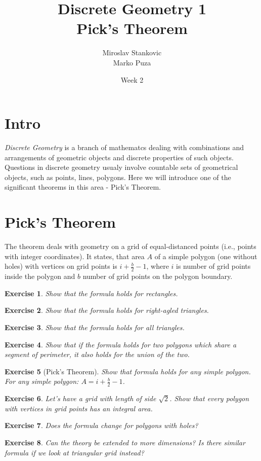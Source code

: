 \documentclass[12pt]{article}
\title{\textbf{Discrete Geometry 1}\\Pick's Theorem}
\date{Week 2}
\author{Miroslav Stankovic\\ Marko Puza}
\newtheorem{exercise}{Exercise}
\begin{document}
\maketitle

\section{Intro}

\emph{Discrete Geometry} is a branch of mathematcs dealing with combinations and arrangements of geometric objects and discrete properties of such objects. Questions in discrete geometry usualy involve countable sets of geometrical objects, such as points, lines, polygons. Here we will introduce one of the significant theorems in this area - Pick's Theorem. 


\section{Pick's Theorem}

The theorem deals with geometry on a grid of equal-distanced points (i.e., points with integer coordinates). It states, that area $A$ of a simple polygon (one without holes) with vertices on grid points is $i + \frac{b}{2} - 1$, where $i$ is number of grid points inside the polygon and $b$ number of grid points on the polygon boundary.


\begin{exercise}
	Show that the formula holds for rectangles.
\end{exercise}

\begin{exercise}
	Show that the formula holds for right-agled triangles.
\end{exercise}

\begin{exercise}
	Show that the formula holds for all triangles.
\end{exercise}

\begin{exercise}
	Show that if the formula holds for two polygons which share a segment of perimeter, it also holds for the union of the two.
\end{exercise}

\begin{exercise}[Pick's Theorem] 
	Show that formula holds for any simple polygon.
	For any simple polygon: $A = i + \frac{b}{2} - 1$.
\end{exercise}

\begin{exercise}
	Let's have a grid with length of side $\sqrt{2}$. Show that every polygon with vertices in grid points has an integral area.
\end{exercise}

\begin{exercise}
	Does the formula change for polygons with holes?
\end{exercise}

\begin{exercise}
	Can the theory be extended to more dimensions? Is there similar formula if we look at triangular grid instead?
\end{exercise}
\end{document}
